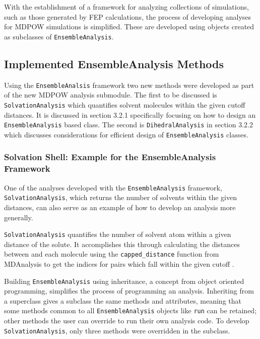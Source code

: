 \documentclass{article}[letterpaper, margins=1in, 12pt]
\begin{document}
With the establishment of a framework for analyzing collections of simulations, such as those generated by FEP calculations, the process of developing analyses for MDPOW simulations is simplified. These are developed using objects created as subclasses of \texttt{EnsembleAnalysis}.

\subsection{Implemented EnsembleAnalysis Methods}
Using the \texttt{EnsembleAnalsis} framework two new methods were developed as part of the new MDPOW analysis submodule. The first to be discussed is \texttt{SolvationAnalysis} which quantifies solvent molecules within the given cutoff distances. It is discussed in section 3.2.1 specifically focusing on how to design an \texttt{EnsembleAnalysis} based class. The second is \texttt{DihedralAnalysis} in section 3.2.2 which discusses considerations for efficient design of \texttt{EnsembleAnalysis} classes.

\subsubsection{Solvation Shell: Example for the EnsembleAnalysis Framework}

One of the analyses developed with the \texttt{EnsembleAnalysis} framework, \texttt{SolvationAnalysis}, which returns the number of solvents within the given distances, can also serve as an example of how to develop an analysis more generally. 

\texttt{SolvationAnalysis} quantifies the number of solvent atom within a given distance of the solute. It accomplishes this through calculating the distances between and each molecule using the \lstinline{capped_distance} function from MDAnalysis to get the indices for pairs which fall within the given cutoff \cite{michaud-agrawal_mdanalysis_2011, gowers_mdanalysis_2016}. 

Building \texttt{EnsembleAnalysis} using inheritance, a concept from object oriented programming, simplifies the process of programming an analysis. Inheriting from a superclass gives a subclass the same methods and attributes, meaning that some methods common to all \texttt{EnsembleAnalysis} objects like \lstinline{run} can be retained; other methods the user can override to run their own analysis code. To develop \texttt{SolvationAnalysis}, only three methods were overridden in the subclass.  
 
\end{document}
